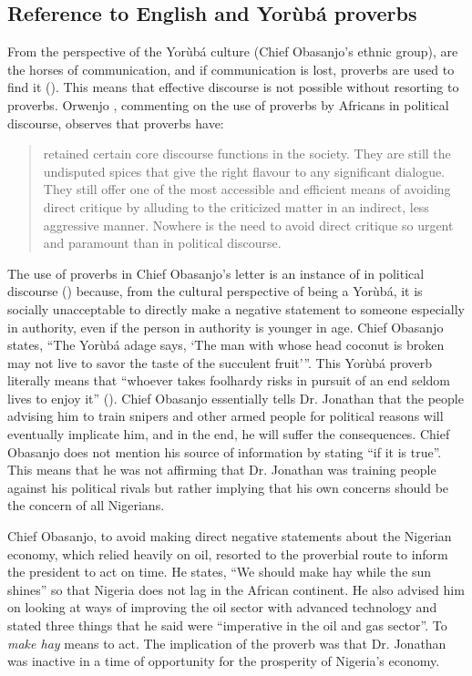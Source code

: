 \documentclass[output=paper,colorlinks,citecolor=brown]{langscibook}
\begin{document}
\subsection{Reference to English and Yorùbá proverbs}
\begin{sloppypar}
From the perspective of the Yorùbá culture (Chief Obasanjo's ethnic group),  are the horses of communication, and if communication is lost, proverbs are used to find it (\cite[497]{Owomoyela2005}). This means that effective discourse is not possible without resorting to proverbs. Orwenjo \citeyearpar[144--145]{Orwenjo2009}, commenting on the use of proverbs by Africans in political discourse, observes that proverbs have:
\end{sloppypar}

\begin{quote}
    retained certain core discourse functions in the society. They are still the undisputed spices that give the right flavour to any significant dialogue. They still offer one of the most accessible and efficient means of avoiding direct critique by alluding to the criticized matter in an indirect, less aggressive manner. Nowhere is the need to avoid direct critique so urgent and paramount than in political discourse.
\end{quote}

The use of proverbs in Chief Obasanjo’s letter is an instance of  in political discourse (\cite{Obeng1997}) because, from the cultural perspective of being a Yorùbá, it is socially unacceptable to directly make a negative statement to someone especially in authority, even if the person in authority is younger in age. Chief Obasanjo states, “The Yorùbá adage says, ‘The man with whose head coconut is broken may not live to savor the taste of the succulent fruit’”. This Yorùbá proverb literally means that “whoever takes foolhardy risks in pursuit of an end seldom lives to enjoy it” (\cite[117]{Owomoyela2005}). Chief Obasanjo essentially tells Dr. Jonathan that the people advising him to train snipers and other armed people for political reasons will eventually implicate him, and in the end, he will suffer the consequences. Chief Obasanjo does not mention his source of information by stating “if it is true”. This means that he was not affirming that Dr. Jonathan was training people against his political rivals but rather implying that his own concerns should be the concern of all Nigerians. 

Chief Obasanjo, to avoid making direct negative statements about the Nigerian economy, which relied heavily on oil, resorted to the proverbial route to inform the president to act on time. He states, “We should make hay while the sun shines” so that Nigeria does not lag in the African continent. He also advised him on looking at ways of improving the oil sector with advanced technology and stated three things that he said were “imperative in the oil and gas sector”. To \textit{make hay} means to act. The  implication of the proverb was that Dr. Jonathan was inactive in a time of opportunity for the prosperity of Nigeria’s economy.
\end{document}
